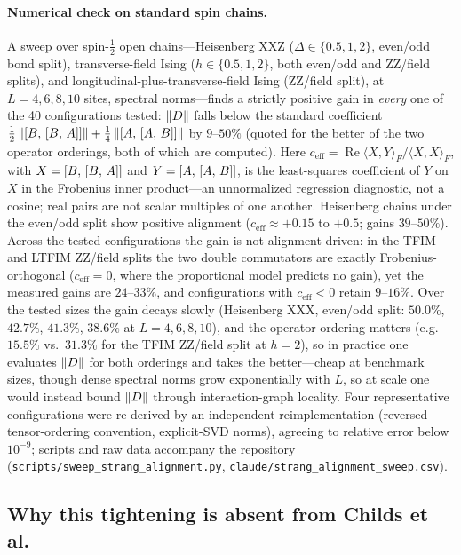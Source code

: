 \paragraph{Numerical check on standard spin chains.}
A sweep over spin-$\tfrac12$ open chains---Heisenberg XXZ
($\Delta \in \{0.5, 1, 2\}$, even/odd bond split), transverse-field Ising
($h \in \{0.5, 1, 2\}$, both even/odd and ZZ/field splits), and
longitudinal-plus-transverse-field Ising (ZZ/field split), at
$L = 4, 6, 8, 10$ sites, spectral norms---finds a strictly positive gain in
\emph{every} one of the 40 configurations tested: $\left\|D\right\|$ falls below the
standard coefficient
$\tfrac12\left\|[B,\,[B,\,A]]\right\| + \tfrac14\left\|[A,\,[A,\,B]]\right\|$
by $9$--$50\%$ (quoted for the better of the two operator orderings, both of
which are computed). Here $c_{\mathrm{eff}} =
\operatorname{Re}\langle X, Y\rangle_F / \langle X, X\rangle_F$, with
$X = [B,\,[B,\,A]]$ and $Y = [A,\,[A,\,B]]$, is the
least-squares coefficient of $Y$ on $X$ in the Frobenius inner
product---an unnormalized regression diagnostic, not a cosine; real pairs
are not scalar multiples of one another. Heisenberg chains
under the even/odd split show positive alignment
($c_{\mathrm{eff}} \approx +0.15$ to $+0.5$; gains
$39$--$50\%$). Across the tested configurations the gain is not
alignment-driven: in the
TFIM and LTFIM ZZ/field splits the two double commutators are exactly
Frobenius-orthogonal ($c_{\mathrm{eff}} = 0$, where the proportional model
predicts no gain), yet the measured gains are $24$--$33\%$, and
configurations with $c_{\mathrm{eff}} < 0$ retain $9$--$16\%$. Over the
tested sizes the gain decays slowly (Heisenberg XXX,
even/odd split: $50.0\%$, $42.7\%$, $41.3\%$, $38.6\%$ at $L = 4, 6, 8, 10$),
and the operator ordering matters (e.g.\ $15.5\%$ vs.\ $31.3\%$ for the TFIM
ZZ/field split at $h = 2$), so in practice one evaluates $\left\|D\right\|$ for both
orderings and takes the better---cheap at benchmark sizes, though dense
spectral norms grow exponentially with $L$, so at scale one would instead
bound $\left\|D\right\|$ through interaction-graph locality. Four representative
configurations were re-derived by an independent reimplementation (reversed
tensor-ordering convention, explicit-SVD norms), agreeing to relative error
below $10^{-9}$; scripts and raw
data accompany the repository
(\texttt{scripts/sweep\_strang\_alignment.py},
\texttt{claude/strang\_alignment\_sweep.csv}).

\subsection{Why this tightening is absent from Childs et al.}
\label{sec:why-absent}

